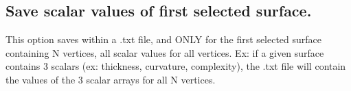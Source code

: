 \subsection{Save scalar values of first selected surface.}
This option saves within a .txt file, and ONLY for the first selected surface containing N vertices, all scalar values for all vertices. Ex: if a given surface contains 3 scalars (ex: thickness, curvature, complexity), the .txt file will contain the values of the 3 scalar arrays for all N vertices. 